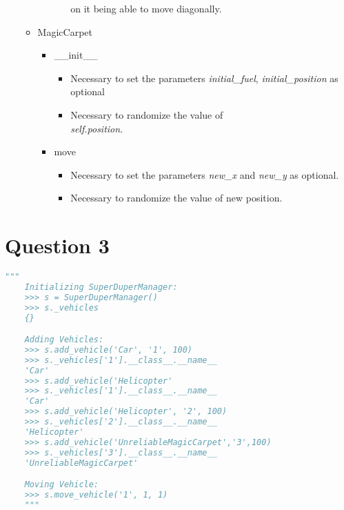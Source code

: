 \documentclass[12pt]{article}
\begin{document}
\begin{enumerate}[a.]
\begin{mdframed}
\begin{itemize}
\begin{itemize}
\begin{itemize}
                    on it being able to move diagonally.
                \end{itemize}
                \color{black}
            \end{itemize}
            \item MagicCarpet
            \begin{itemize}
                \item \_\_init\_\_
                \color{red}
                \begin{itemize}
                    \item Necessary to set the parameters \textit{initial\_fuel},
                    \textit{initial\_position} as optional
                    \item Necessary to randomize the value of \\\textit{self.position}.
                \end{itemize}
                \color{black}
                \item move
                \color{red}
                \begin{itemize}
                    \item Necessary to set the parameters \textit{new\_x} and \textit{new\_y}
                    as optional.
                    \item Necessary to randomize the value of new position.
                \end{itemize}
                \color{black}

            \end{itemize}
        \end{itemize}

    \end{mdframed}

\end{enumerate}

\section*{Question 3}
\begin{lstlisting}[language=Python]
    """
    Initializing SuperDuperManager:
    >>> s = SuperDuperManager()
    >>> s._vehicles
    {}

    Adding Vehicles:
    >>> s.add_vehicle('Car', '1', 100)
    >>> s._vehicles['1'].__class__.__name__
    'Car'
    >>> s.add_vehicle('Helicopter'
    >>> s._vehicles['1'].__class__.__name__
    'Car'
    >>> s.add_vehicle('Helicopter', '2', 100)
    >>> s._vehicles['2'].__class__.__name__
    'Helicopter'
    >>> s.add_vehicle('UnreliableMagicCarpet','3',100)
    >>> s._vehicles['3'].__class__.__name__
    'UnreliableMagicCarpet'

    Moving Vehicle:
    >>> s.move_vehicle('1', 1, 1)
    """
\end{lstlisting}
\end{document}
